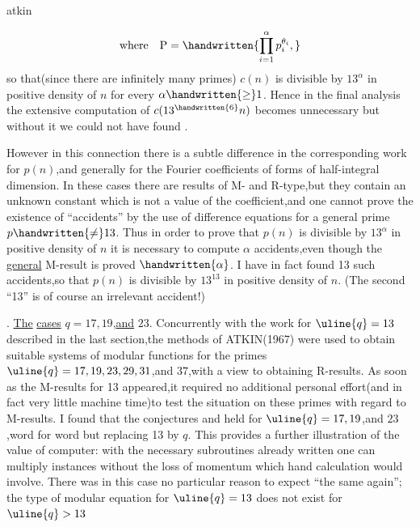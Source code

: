 \noindent\hfill atkin 

\[
\text{where}\quad\mathrm{P}=\handwritten{\prod_{i=1}^{\alpha}p_i^{\theta_i},}
\]
\noindent so that(since there are infinitely many primes) \uline{$c(n)$} is divisible by $13^{\alpha}$ in positive density of $n$ for every $\alpha\handwritten{\geq}1$. Hence in the final analysis the extensive computation of $c(13^{\handwritten{6}}n)$ becomes unnecessary  but without it we could not have found .

However in this connection there is a subtle difference in the corresponding work for \uline{$p(n)$},and generally for the Fourier coefficients of forms of half-integral dimension. In these cases there are results of M- and R-type,but they contain an unknown constant which is not a value of the coefficient,and one cannot prove the existence of ``accidents'' by the use of difference equations for a general prime $p\handwritten{\ne}13$. Thus in order to prove that \uline{$p(n)$} is divisible by $13^{\alpha}$ in positive density of \uline{$n$} it is necessary to compute $\alpha$ accidents,even though the \uline{general} M-result is proved  $\handwritten{\alpha}$. I have in fact found 13 such accidents,so that \uline{$p(n)$} is divisible by $13^{13}$ in positive density of $n$. (The second ``13'' is of course an irrelevant accident!)

\noindent {}. \uline{The} \uline{cases} $q=17,19$,\uline{and} $23$. Concurrently with the work for $\uline{q}=13$ described in the last section,the methods of ATKIN(1967) were used to obtain suitable systems of modular functions for the primes $\uline{q}=17,19,23,29,31$,and $37$,with a view to obtaining  R-results. As soon as the M-results for 13 appeared,it required no additional personal effort(and in fact very little machine time)to test the situation on these primes with regard to M-results. I found that the conjectures  and  held for $\uline{q}=17,19$,and $23$,word for word but replacing 13 by \uline{$q$}. This provides a further illustration of the value of  computer: with the necessary subroutines already written one can multiply instances without the loss of momentum which hand calculation would involve. There was in this case no particular reason to expect ``the same again''; the type of modular equation for $\uline{q}=13$ does not exist for $\uline{q}>13$

